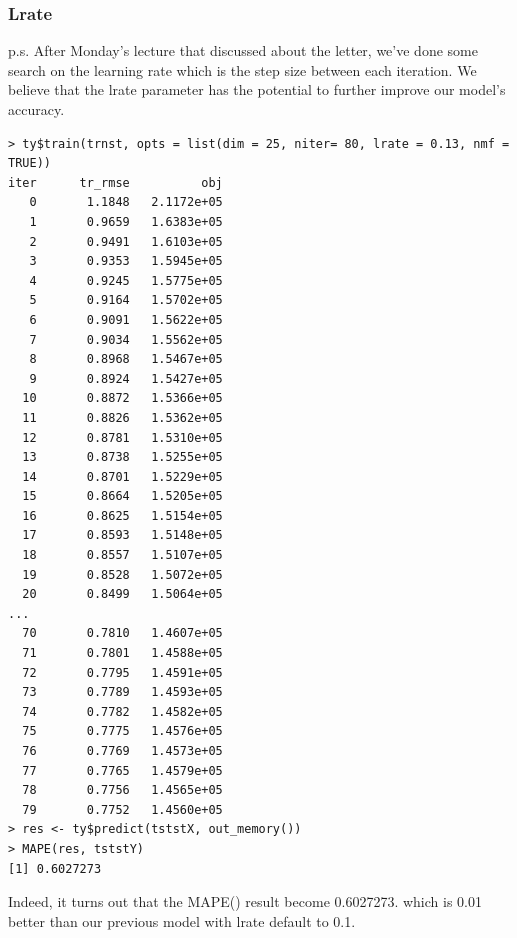 \documentclass[11pt]{article}
\newcommand\tab[1][0.5cm]{\hspace*{#1}}
\begin{document}
\subsubsection{Lrate}
\tab{}p.s. After Monday's lecture that discussed about the letter, we've done some search on the learning rate which is the step size between each iteration. We believe that the lrate parameter has the potential to further improve our model's accuracy.
\begin{verbatim}
> ty$train(trnst, opts = list(dim = 25, niter= 80, lrate = 0.13, nmf = TRUE))
iter      tr_rmse          obj
   0       1.1848   2.1172e+05
   1       0.9659   1.6383e+05
   2       0.9491   1.6103e+05
   3       0.9353   1.5945e+05
   4       0.9245   1.5775e+05
   5       0.9164   1.5702e+05
   6       0.9091   1.5622e+05
   7       0.9034   1.5562e+05
   8       0.8968   1.5467e+05
   9       0.8924   1.5427e+05
  10       0.8872   1.5366e+05
  11       0.8826   1.5362e+05
  12       0.8781   1.5310e+05
  13       0.8738   1.5255e+05
  14       0.8701   1.5229e+05
  15       0.8664   1.5205e+05
  16       0.8625   1.5154e+05
  17       0.8593   1.5148e+05
  18       0.8557   1.5107e+05
  19       0.8528   1.5072e+05
  20       0.8499   1.5064e+05
...
  70       0.7810   1.4607e+05
  71       0.7801   1.4588e+05
  72       0.7795   1.4591e+05
  73       0.7789   1.4593e+05
  74       0.7782   1.4582e+05
  75       0.7775   1.4576e+05
  76       0.7769   1.4573e+05
  77       0.7765   1.4579e+05
  78       0.7756   1.4565e+05
  79       0.7752   1.4560e+05
> res <- ty$predict(tststX, out_memory())
> MAPE(res, tststY)
[1] 0.6027273
\end{verbatim}
\tab{}Indeed, it turns out that the MAPE() result become 0.6027273. which is 0.01 better than our previous model with lrate default to 0.1.
\end{document}
